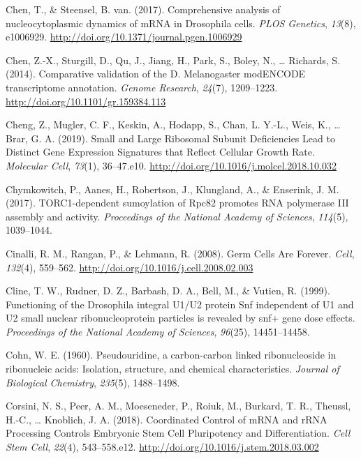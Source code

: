 \documentclass[12pt,twoside]{reedthesis}
\newlength{\cslhangindent}
\newenvironment{cslreferences}%
  {\setlength{\parindent}{0pt}%
  \everypar{\setlength{\hangindent}{\cslhangindent}}\ignorespaces}%
  {\par}
\begin{document}
\begin{cslreferences}
\leavevmode\hypertarget{ref-chenComprehensiveAnalysisNucleocytoplasmic2017}{}%
Chen, T., \& Steensel, B. van. (2017). Comprehensive analysis of nucleocytoplasmic dynamics of mRNA in Drosophila cells. \emph{PLOS Genetics}, \emph{13}(8), e1006929. \url{http://doi.org/10.1371/journal.pgen.1006929}

\leavevmode\hypertarget{ref-chenComparativeValidationMelanogaster2014}{}%
Chen, Z.-X., Sturgill, D., Qu, J., Jiang, H., Park, S., Boley, N., \ldots{} Richards, S. (2014). Comparative validation of the D. Melanogaster modENCODE transcriptome annotation. \emph{Genome Research}, \emph{24}(7), 1209--1223. \url{http://doi.org/10.1101/gr.159384.113}

\leavevmode\hypertarget{ref-chengSmallLargeRibosomal2019}{}%
Cheng, Z., Mugler, C. F., Keskin, A., Hodapp, S., Chan, L. Y.-L., Weis, K., \ldots{} Brar, G. A. (2019). Small and Large Ribosomal Subunit Deficiencies Lead to Distinct Gene Expression Signatures that Reflect Cellular Growth Rate. \emph{Molecular Cell}, \emph{73}(1), 36--47.e10. \url{http://doi.org/10.1016/j.molcel.2018.10.032}

\leavevmode\hypertarget{ref-Chymkowitch2017a}{}%
Chymkowitch, P., Aanes, H., Robertson, J., Klungland, A., \& Enserink, J. M. (2017). TORC1-dependent sumoylation of Rpc82 promotes RNA polymerase III assembly and activity. \emph{Proceedings of the National Academy of Sciences}, \emph{114}(5), 1039--1044.

\leavevmode\hypertarget{ref-Cinalli2008d}{}%
Cinalli, R. M., Rangan, P., \& Lehmann, R. (2008). Germ Cells Are Forever. \emph{Cell}, \emph{132}(4), 559--562. \url{http://doi.org/10.1016/j.cell.2008.02.003}

\leavevmode\hypertarget{ref-Cline1999}{}%
Cline, T. W., Rudner, D. Z., Barbash, D. A., Bell, M., \& Vutien, R. (1999). Functioning of the Drosophila integral U1/U2 protein Snf independent of U1 and U2 small nuclear ribonucleoprotein particles is revealed by snf+ gene dose effects. \emph{Proceedings of the National Academy of Sciences}, \emph{96}(25), 14451--14458.

\leavevmode\hypertarget{ref-Cohn1960}{}%
Cohn, W. E. (1960). Pseudouridine, a carbon-carbon linked ribonucleoside in ribonucleic acids: Isolation, structure, and chemical characteristics. \emph{Journal of Biological Chemistry}, \emph{235}(5), 1488--1498.

\leavevmode\hypertarget{ref-corsiniCoordinatedControlMRNA2018}{}%
Corsini, N. S., Peer, A. M., Moeseneder, P., Roiuk, M., Burkard, T. R., Theussl, H.-C., \ldots{} Knoblich, J. A. (2018). Coordinated Control of mRNA and rRNA Processing Controls Embryonic Stem Cell Pluripotency and Differentiation. \emph{Cell Stem Cell}, \emph{22}(4), 543--558.e12. \url{http://doi.org/10.1016/j.stem.2018.03.002}


\end{cslreferences}
\end{document}
